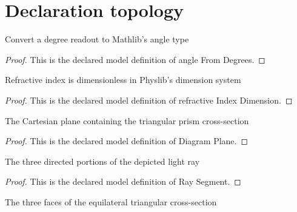 \section{Declaration topology}
\begin{definition}
  \label{def:physics:phyx-mini-0074:phyxminiproblems-problemphyxmini0074-anglefromdegrees}
  Convert a degree readout to Mathlib's angle type
\end{definition}
\begin{proof}
  This is the declared model definition of angle From Degrees.
\end{proof}
\begin{definition}
  \label{def:physics:phyx-mini-0074:phyxminiproblems-problemphyxmini0074-refractiveindexdimension}
  Refractive index is dimensionless in Physlib's dimension system
\end{definition}
\begin{proof}
  This is the declared model definition of refractive Index Dimension.
\end{proof}
\begin{definition}
  \label{def:physics:phyx-mini-0074:phyxminiproblems-problemphyxmini0074-diagramplane}
  The Cartesian plane containing the triangular prism cross-section
\end{definition}
\begin{proof}
  This is the declared model definition of Diagram Plane.
\end{proof}
\begin{definition}
  \label{def:physics:phyx-mini-0074:phyxminiproblems-problemphyxmini0074-raysegment}
  The three directed portions of the depicted light ray
\end{definition}
\begin{proof}
  This is the declared model definition of Ray Segment.
\end{proof}
\begin{definition}
  \label{def:physics:phyx-mini-0074:phyxminiproblems-problemphyxmini0074-prismface}
  The three faces of the equilateral triangular cross-section
\end{definition}
